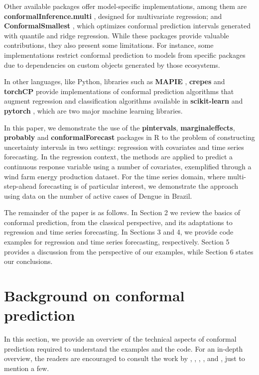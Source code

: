 Other available packages offer model-specific
implementations, among them are \textbf{conformalInference.multi}
\citep{conformalmulti}, designed for multivariate regression; and
\textbf{ConformalSmallest} \citep{ConformalSmallest}, which optimizes conformal
prediction intervals generated with quantile and ridge regression. While
these packages provide valuable contributions, they also present some
limitations. For instance, some implementations restrict conformal
prediction to models from specific packages due to dependencies on
custom objects generated by those ecosystems.

In other languages, like Python, libraries such as \textbf{MAPIE}
\citep{Cordier_Flexible_and_Systematic_2023}, \textbf{crepes} \citep{bostrom2024} and
\textbf{torchCP} \citep{huang2024torchcp} provide implementations of conformal
prediction algorithms that augment regression and classification
algorithms available in \textbf{scikit-learn} \citep{scikit-learn} and \textbf{pytorch}
\citep{pytorch_2019}, which are two major machine learning libraries.

In this paper, we demonstrate the use of the \textbf{pintervals},
\textbf{marginaleffects}, \textbf{probably} and \textbf{conformalForecast} packages in R to
the problem of constructing uncertainty intervals in two settings:
regression with covariates and time series forecasting. In the regression
context, the methods are applied to predict a continuous response
variable using a number of covariates, exemplified through a wind farm
energy production dataset. For the time series domain, where
multi-step-ahead forecasting is of particular interest, we demonstrate
the approach using data on the number of active cases of Dengue in
Brazil.

The remainder of the paper is as follows. In Section 2 we review the
basics of conformal prediction, from the classical perspective, and its
adaptations to regression and time series forecasting. In Sections 3 and
4, we provide code examples for regression and time series forecasting,
respectively. Section 5 provides a discussion from the perspective of
our examples, while Section 6 states our conclusions.

\section{Background on conformal prediction}\label{background-on-conformal-prediction}

In this section, we provide an overview of the technical aspects of
conformal prediction required to understand the examples and the code.
For an in-depth overview, the readers are encouraged to consult the work
by \citet{vovk2022}, \citet{shafer2008}, \citet{lei2018},
\citet{romano2019}, and \citet{Wang_Hyndman_2024}, just to mention a few.


